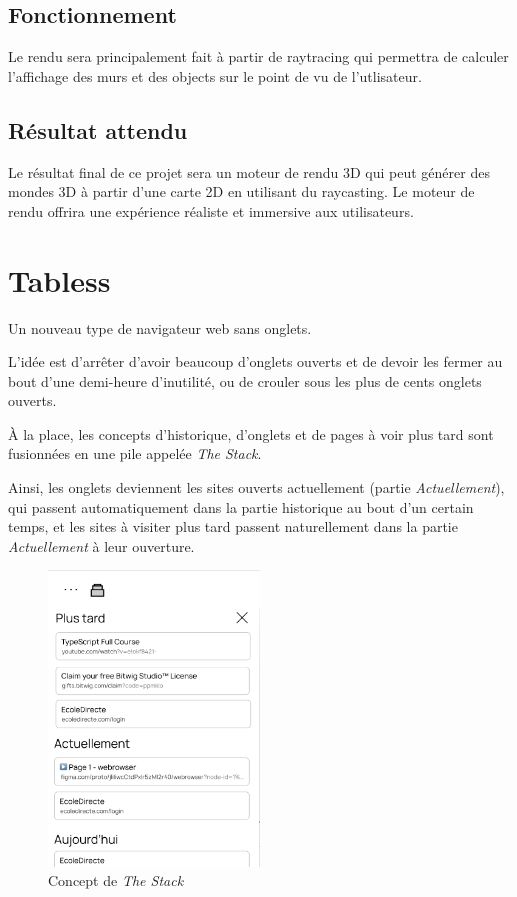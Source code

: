 \documentclass{article}
\begin{document}
\subsection{Fonctionnement}
Le rendu sera principalement fait à partir de raytracing qui permettra de calculer l'affichage des murs et des objects sur le point de vu de l'utlisateur.

\subsection{Résultat attendu}
Le résultat final de ce projet sera un moteur de rendu 3D qui peut générer des mondes 3D à partir d'une carte 2D en utilisant du raycasting. Le moteur de rendu offrira une expérience réaliste et immersive aux utilisateurs.

\newpage
\section{Tabless}

Un nouveau type de navigateur web sans onglets.

L'idée est d'arrêter d'avoir beaucoup d'onglets ouverts et de devoir les fermer au bout d'une demi-heure d'inutilité, ou de crouler sous les plus de cents onglets ouverts.

À la place, les concepts d'historique, d'onglets et de pages à voir plus tard sont fusionnées en une pile appelée \emph{The Stack}.

Ainsi, les onglets deviennent les sites ouverts actuellement (partie \emph{Actuellement}), qui passent automatiquement dans la partie historique au bout d'un certain temps, et les sites à visiter plus tard passent naturellement dans la partie \emph{Actuellement} à leur ouverture.

\begin{figure}[H]
    \centering
    \includegraphics[width=0.5\textwidth]{tabless.png}
    \caption{Concept de \emph{The Stack}}
    \label{fig:tabless}
\end{figure}
    
\end{document}
